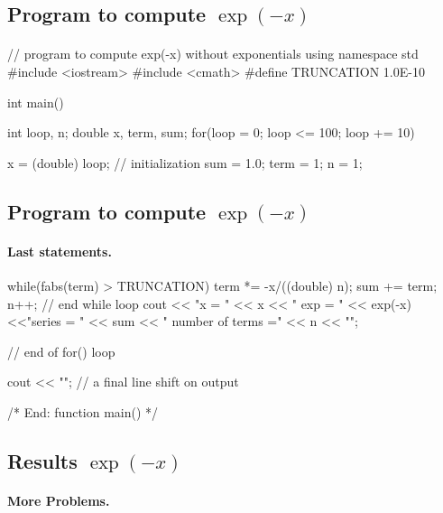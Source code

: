 \documentclass[%
oneside,                 %
final,                   %
10pt]{article}
\begin{document}
{{{{{{\noindent




\subsection{Program to compute $\exp{(-x)}$}


\paragraph{}
\bcppcod
// program to compute exp(-x) without exponentials
using namespace std
#include <iostream>
#include <cmath>
#define  TRUNCATION     1.0E-10

int main()
{
   int       loop, n;
   double    x, term, sum;
   for(loop = 0; loop <= 100; loop += 10)
   {
     x    = (double) loop;          // initialization
     sum  = 1.0;
     term = 1;
     n    = 1;
\ecppcod



\subsection{Program to compute $\exp{(-x)}$}


\paragraph{Last statements.}
\bcppcod
     while(fabs(term) > TRUNCATION)
       {
	 term *= -x/((double) n);
	 sum  += term;
	 n++;
       } // end while loop
     cout << "x = " << x   << " exp = " << exp(-x) <<"series = "
          << sum  << " number of terms =" << n << "\n";
   } // end of for() loop

   cout << "\n";           // a final line shift on output

}  /*    End: function main() */
\ecppcod




\subsection{Results $\exp{(-x)}$}


\paragraph{More Problems.}


}}}}}}
\end{document}
